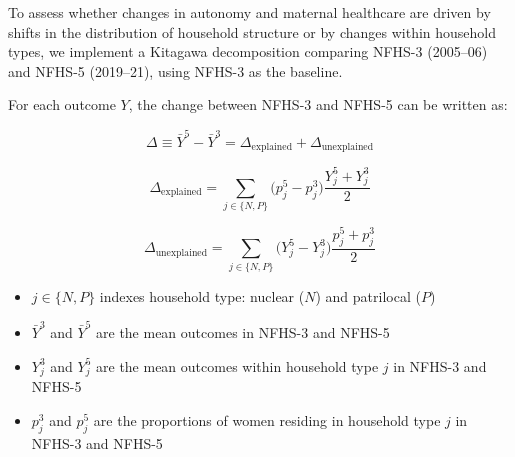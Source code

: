 \documentclass[12pt]{article}
\begin{document}
To assess whether changes in autonomy and maternal healthcare are driven by shifts in the distribution of household structure or by changes within household types, we implement a Kitagawa decomposition \citep{kitagawa1955components} comparing NFHS-3 (2005--06) and NFHS-5 (2019--21), using NFHS-3 as the baseline.

For each outcome $Y$, the change between NFHS-3 and NFHS-5 can be written as:

\begin{equation}
\Delta \equiv \bar Y^{5} - \bar Y^{3}
= \Delta_{\text{explained}} + \Delta_{\text{unexplained}}
\end{equation}

\begin{equation}
\Delta_{\text{explained}} =
\sum_{j \in \{N,P\}} \big(p_j^{5} - p_j^{3}\big)\frac{Y_j^{5} + Y_j^{3}}{2}
\end{equation}

\begin{equation}
\Delta_{\text{unexplained}} =
\sum_{j \in \{N,P\}} \big(Y_j^{5} - Y_j^{3}\big)\frac{p_j^{5} + p_j^{3}}{2}
\end{equation}

\begin{itemize}
    \item $j \in \{N,P\}$ indexes household type: nuclear ($N$) and patrilocal ($P$)
    \item $\bar Y^{3}$ and $\bar Y^{5}$ are the mean outcomes in NFHS-3 and NFHS-5
    \item $Y_j^{3}$ and $Y_j^{5}$ are the mean outcomes within household type $j$ in NFHS-3 and NFHS-5
    \item $p_j^{3}$ and $p_j^{5}$ are the proportions of women residing in household type $j$ in NFHS-3 and NFHS-5
\end{itemize}
\end{document}
